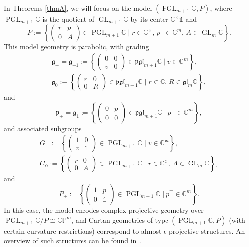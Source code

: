 \documentclass[10pt,a4paper]{amsart}
\numberwithin{equation}{section}
\theoremstyle{definition}
\DeclareMathOperator{\GLin}{\mathrm{GL}}
\DeclareMathOperator{\PGL}{\mathrm{PGL}}
\begin{document}
In Theorems \ref{thmA}, we will focus on the model $(\PGL_{m+1}\mathbb{C},P)$, where $\PGL_{m+1}\mathbb{C}$ is the quotient of $\GLin_{m+1}\mathbb{C}$ by its center $\mathbb{C}^\times\mathds{1}$ and \[P:=\left\{\begin{pmatrix}r & p \\ 0 & A\end{pmatrix}\in\PGL_{m+1}\mathbb{C}\mid r\in\mathbb{C}^\times,\,p^\top\in\mathbb{C}^m,\, A\in\GLin_m\mathbb{C}\right\}.\] This model geometry is parabolic, with grading
\begin{gather*}
\mathfrak{g}_-=\mathfrak{g}_{-1}:=\left\{\begin{pmatrix}0 & 0 \\ v & 0\end{pmatrix}\in\mathfrak{pgl}_{m+1}\mathbb{C}\mid v\in\mathbb{C}^m\right\},\\
\mathfrak{g}_0:=\left\{\begin{pmatrix}r & 0 \\ 0 & R\end{pmatrix}\in\mathfrak{pgl}_{m+1}\mathbb{C}\mid r\in\mathbb{C},\, R\in\mathfrak{gl}_m\mathbb{C}\right\},
\end{gather*}
 and \[\mathfrak{p}_+=\mathfrak{g}_1:=\left\{\begin{pmatrix}0 & p \\ 0 & 0\end{pmatrix}\in\mathfrak{pgl}_{m+1}\mathbb{C}\mid p^\top\in\mathbb{C}^m\right\},\] and associated subgroups
 \begin{gather*}
 G_-:=\left\{\begin{pmatrix}1 & 0 \\ v & \mathds{1}\end{pmatrix}\in\PGL_{m+1}\mathbb{C}\mid v\in\mathbb{C}^m\right\},\\ G_0:=\left\{\begin{pmatrix}r & 0 \\ 0 & A\end{pmatrix}\in\PGL_{m+1}\mathbb{C}\mid r\in\mathbb{C}^\times,\,  A\in\GLin_m\mathbb{C}\right\},
  \end{gather*}
  and \[P_+:=\left\{\begin{pmatrix}1 & p \\ 0 & \mathds{1}\end{pmatrix}\in\PGL_{m+1}\mathbb{C}\mid p^\top\in\mathbb{C}^m\right\}.\] In this case, the model encodes complex projective geometry over $\PGL_{m+1}\mathbb{C}/P\cong\mathbb{CP}^m$, and Cartan geometries of type $(\PGL_{m+1}\mathbb{C},P)$ (with certain curvature restrictions) correspond to almost c-projective structures. An overview of such structures can be found in~\cite{cprojCEMN}.
\end{document}
